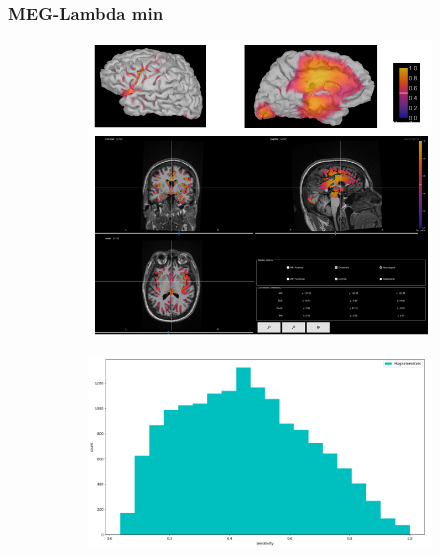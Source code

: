 \documentclass{beamer}
\numberwithin{figure}{section}
\numberwithin{equation}{section}
\begin{document}
\section{}
\begin{frame}
 \frametitle{MEG-Lambda min}
  

 	\begin{figure}[h]
        \begin{subfigure}[h]{0.53\linewidth} 
            \includegraphics[width=\linewidth]{pictures/meg1}
            \label{fig:rdf_graph}
        \end{subfigure}       
        \begin{subfigure}[h]{0.45\linewidth} 
            \includegraphics[width=\linewidth]{pictures/HISTmeg2.png}
            \label{fig:rdfs_graph}
        \end{subfigure}
    \end{figure}

  
\end{frame}
\end{document}
